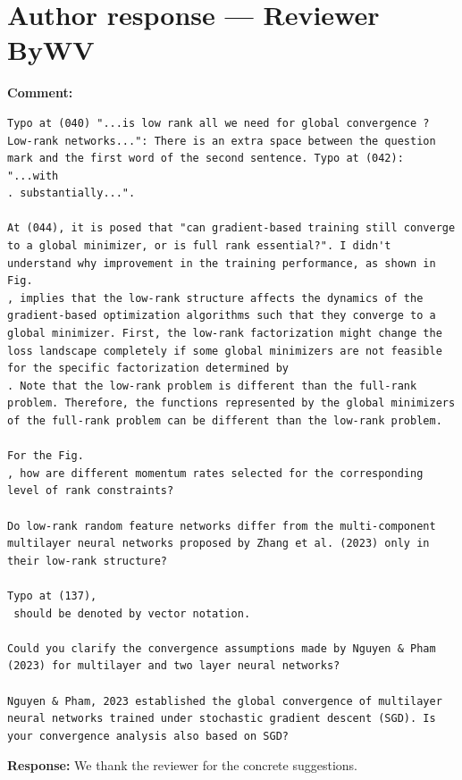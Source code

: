 \documentclass[11pt,a4paper]{article}
\begin{document}
\section*{Author response --- Reviewer ByWV}

\textbf{Comment:}
\begin{verbatim}
Typo at (040) "...is low rank all we need for global convergence ? Low-rank networks...": There is an extra space between the question mark and the first word of the second sentence. Typo at (042): "...with
. substantially...".

At (044), it is posed that "can gradient-based training still converge to a global minimizer, or is full rank essential?". I didn't understand why improvement in the training performance, as shown in Fig.
, implies that the low-rank structure affects the dynamics of the gradient-based optimization algorithms such that they converge to a global minimizer. First, the low-rank factorization might change the loss landscape completely if some global minimizers are not feasible for the specific factorization determined by
. Note that the low-rank problem is different than the full-rank problem. Therefore, the functions represented by the global minimizers of the full-rank problem can be different than the low-rank problem.

For the Fig.
, how are different momentum rates selected for the corresponding level of rank constraints?

Do low-rank random feature networks differ from the multi-component multilayer neural networks proposed by Zhang et al. (2023) only in their low-rank structure?

Typo at (137),
 should be denoted by vector notation.

Could you clarify the convergence assumptions made by Nguyen & Pham (2023) for multilayer and two layer neural networks?

Nguyen & Pham, 2023 established the global convergence of multilayer neural networks trained under stochastic gradient descent (SGD). Is your convergence analysis also based on SGD?
\end{verbatim}
\textbf{Response:} We thank the reviewer for the concrete suggestions.
\end{document}
